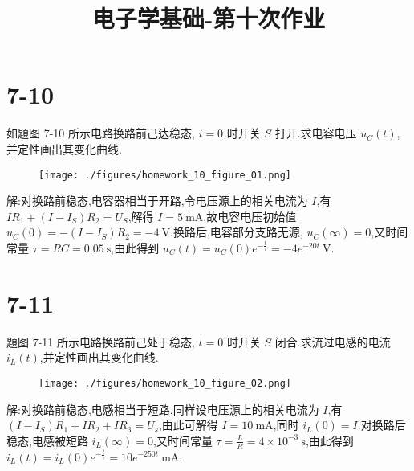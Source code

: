 
\usepackage{../../homeworks_preamble}
\title{电子学基础-第十次作业}


    \maketitle
    \section{7-10} 如題图 7-10 所示电路换路前己达稳态, $i=0$ 时开关 $S$ 打开.求电容电压 $u_{C}\left( t \right) $,并定性画出其变化曲线.
    \begin{figure}[htbp]
        \centering
        \texttt{[image: ./figures/homework\_10\_figure\_01.png]}
    \end{figure}
    
    解:对换路前稳态,电容器相当于开路,令电压源上的相关电流为 $I$,有 $IR_1+\left( I-I_{S} \right) R_2=U_{S}$,解得 $I=5 \ \mathrm{mA}$,故电容电压初始值 $u_{C}\left( 0 \right) =-\left( I-I_{S} \right) R_2=-4 \ \mathrm{V}$.换路后,电容部分支路无源, $u_{C}\left( \infty \right) =0$,又时间常量 $\tau=RC=0.05 \ \mathrm{s}$,由此得到 $u_{C}\left( t \right) =u_{C}\left( 0 \right) e^{-\frac{t}{\tau}}=-4e^{-20t} \ \mathrm{V}$.

    \section{7-11} 題图 7-11 所示电路换路前己处于稳态, $t=0$ 时开关 $S$ 闭合.求流过电感的电流 $i_{L}\left( t \right) $,并定性画出其变化曲线.

    \begin{figure}[htbp]
        \centering
        \texttt{[image: ./figures/homework\_10\_figure\_02.png]}
    \end{figure}
    
    解:对换路前稳态,电感相当于短路,同样设电压源上的相关电流为 $I$,有 $\left( I-I_{S} \right) R_1+IR_2+IR_3=U_{s}$,由此可解得 $I=10 \ \mathrm{mA}$,同时 $i_{L}\left( 0 \right) =I$.对换路后稳态,电感被短路 $i_{L}\left( \infty \right) =0$,又时间常量 $\tau=\frac{L}{R}=4\times 10^{-3} \ \mathrm{s}$,由此得到 $i_{L}\left( t \right) =i_{L}\left( 0 \right) e^{-\frac{t}{\tau}}=10e^{-250t} \ \mathrm{mA}$.

